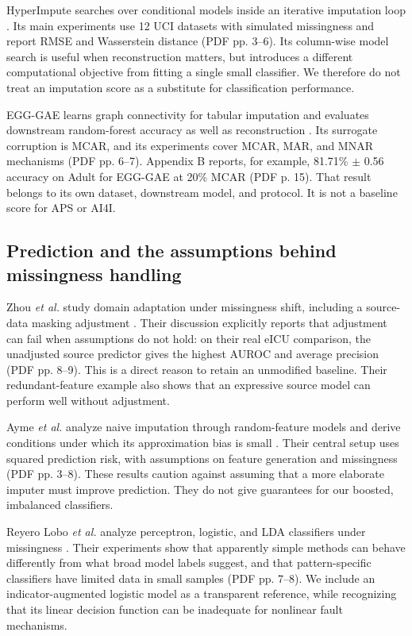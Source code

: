 \documentclass[conference]{IEEEtran}
\begin{document}
HyperImpute searches over conditional models inside an iterative imputation loop \cite{jarrett22a}. Its main experiments use 12 UCI datasets with simulated missingness and report RMSE and Wasserstein distance (PDF pp. 3--6). Its column-wise model search is useful when reconstruction matters, but introduces a different computational objective from fitting a single small classifier. We therefore do not treat an imputation score as a substitute for classification performance.

EGG-GAE learns graph connectivity for tabular imputation and evaluates downstream random-forest accuracy as well as reconstruction \cite{telyatnikov23a}. Its surrogate corruption is MCAR, and its experiments cover MCAR, MAR, and MNAR mechanisms (PDF pp. 6--7). Appendix B reports, for example, 81.71\% $\pm$ 0.56 accuracy on Adult for EGG-GAE at 20\% MCAR (PDF p. 15). That result belongs to its own dataset, downstream model, and protocol. It is not a baseline score for APS or AI4I.

\subsection{Prediction and the assumptions behind missingness handling}
Zhou \emph{et al.} study domain adaptation under missingness shift, including a source-data masking adjustment \cite{zhou23b}. Their discussion explicitly reports that adjustment can fail when assumptions do not hold: on their real eICU comparison, the unadjusted source predictor gives the highest AUROC and average precision (PDF pp. 8--9). This is a direct reason to retain an unmodified baseline. Their redundant-feature example also shows that an expressive source model can perform well without adjustment.

Ayme \emph{et al.} analyze naive imputation through random-feature models and derive conditions under which its approximation bias is small \cite{ayme24a}. Their central setup uses squared prediction risk, with assumptions on feature generation and missingness (PDF pp. 3--8). These results caution against assuming that a more elaborate imputer must improve prediction. They do not give guarantees for our boosted, imbalanced classifiers.

Reyero Lobo \emph{et al.} analyze perceptron, logistic, and LDA classifiers under missingness \cite{lobo25a}. Their experiments show that apparently simple methods can behave differently from what broad model labels suggest, and that pattern-specific classifiers have limited data in small samples (PDF pp. 7--8). We include an indicator-augmented logistic model as a transparent reference, while recognizing that its linear decision function can be inadequate for nonlinear fault mechanisms.
\end{document}

